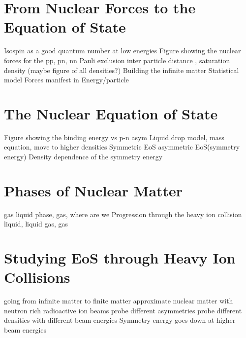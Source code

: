 




















\section{From Nuclear Forces to the Equation of State}
Isospin as a good quantum number at low energies 
Figure showing the nuclear forces for the pp, pn, nn 
Pauli exclusion 
inter particle distance , saturation density (maybe figure of all densities?)
Building the infinite matter
Statistical model 
Forces manifest in Energy/particle 

\section{The Nuclear Equation of State}
Figure showing the binding energy vs p-n asym
Liquid drop model, mass equation, move to higher densities
Symmetric EoS asymmetric EoS(symmetry energy)
Density dependence of the symmetry energy 

\section{Phases of Nuclear Matter}
gas liquid phase, gas, where are we
Progression through the heavy ion collision 
liquid, liquid gas, gas 

\section{Studying EoS through Heavy Ion Collisions}
going from infinite matter to finite matter 
approximate nuclear matter with neutron rich radioactive ion beams
probe different asymmetries 
probe different densities with different beam energies 
Symmetry energy goes down at higher beam energies

